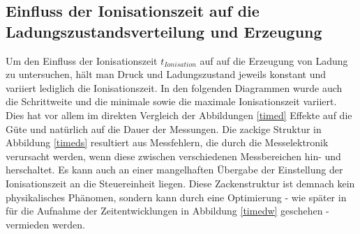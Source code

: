 	\subsection{Einfluss der Ionisationszeit auf die Ladungszustandsverteilung und Erzeugung}
        Um den Einfluss der Ionisationszeit $t_{Ionisation}$ auf auf die Erzeugung von Ladung zu untersuchen, hält man Druck und Ladungszustand jeweils konstant und variiert lediglich die Ionisationszeit. In den folgenden Diagrammen wurde auch die Schrittweite und die minimale sowie die maximale Ionisationszeit variiert. Dies hat vor allem im direkten Vergleich der Abbildungen \ref{timed} Effekte auf die Güte und natürlich auf die Dauer der Messungen. Die zackige Struktur in Abbildung \ref{timeds} resultiert aus Messfehlern, die durch die Messelektronik verursacht werden, wenn diese zwischen verschiedenen Messbereichen hin- und herschaltet. Es kann auch an einer mangelhaften Übergabe der Einstellung der Ionisationszeit an die Steuereinheit liegen. Diese Zackenstruktur ist demnach kein physikalisches Phänomen, sondern kann durch eine Optimierung - wie später in für die Aufnahme der Zeitentwicklungen in Abbildung \ref{timedw} geschehen - vermieden werden.
